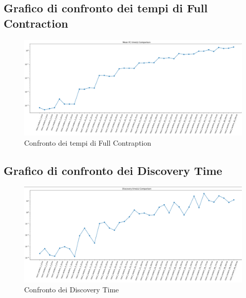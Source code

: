 \subsection{Grafico di confronto dei tempi di Full Contraction}
\begin{center}\label{fc_time}
	\begin{figure}[H]
		\centering
		\hspace{-1cm}\includegraphics[width=\linewidth]{Img/fc_time_graph.jpg}
		\caption{Confronto dei tempi di Full Contraption}
	\end{figure}
\end{center}

\subsection{Grafico di confronto dei Discovery Time}
\begin{center}
	\begin{figure}[H]
		\centering
		\hspace{-1cm}\includegraphics[width=\linewidth]{Img/disc_time_graph.jpg}
		\caption{Confronto dei Discovery Time}
	\end{figure}
\end{center}

